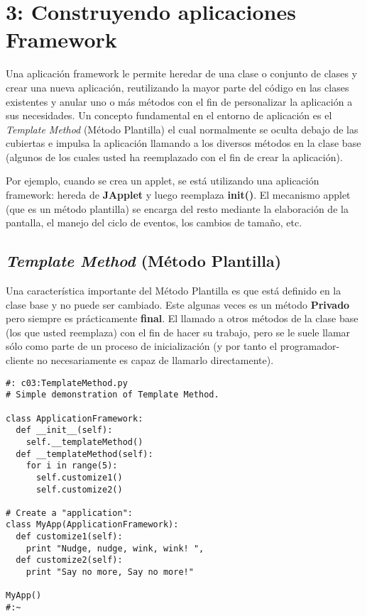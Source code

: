 \section*{3: Construyendo aplicaciones Framework}
\label{sec:caf}

Una aplicación framework le permite heredar de una clase o conjunto de clases y crear una nueva aplicación, reutilizando la mayor parte del código en las clases existentes y anular uno o más métodos con el fin de personalizar la aplicación a sus necesidades. Un concepto fundamental en el entorno de aplicación es el \textit{Template Method} (Método Plantilla) el cual normalmente se oculta debajo de las cubiertas e impulsa la aplicación  llamando a los diversos métodos en la clase base (algunos de los cuales usted ha reemplazado con el fin de crear la aplicación).    \newline

Por ejemplo, cuando se crea un applet, se está utilizando una aplicación framework: hereda de \textbf{JApplet} y luego reemplaza \textbf{init()}. El mecanismo applet (que es un método plantilla) se encarga del resto mediante la elaboración de la pantalla, el manejo del ciclo de eventos, los cambios de tamaño, etc.
        
        
\subsection*{\textit{Template Method} (Método Plantilla)}
\label{subsec:tm}
        
        
        
Una característica importante del Método Plantilla es que está definido en la clase base y no puede ser cambiado. Este algunas veces es un método \textbf{Privado} pero siempre es prácticamente \textbf{final}. El llamado a otros métodos de la clase base (los que usted reemplaza) con el fin de hacer su trabajo, pero se le suele llamar sólo como parte de un proceso de inicialización (y por tanto el programador-cliente no necesariamente es capaz de llamarlo directamente).    \newline

 \begin{lstlisting}
#: c03:TemplateMethod.py 
# Simple demonstration of Template Method. 

class ApplicationFramework: 
  def __init__(self): 
    self.__templateMethod() 
  def __templateMethod(self): 
    for i in range(5): 
      self.customize1() 
      self.customize2() 
      
# Create a "application": 
class MyApp(ApplicationFramework): 
  def customize1(self): 
    print "Nudge, nudge, wink, wink! ", 
  def customize2(self):  
    print "Say no more, Say no more!" 
    
MyApp() 
#:~ 
\end{lstlisting}

